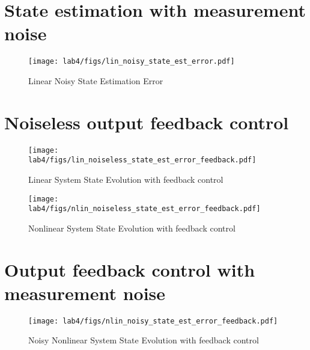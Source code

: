 \documentclass[10pt]{article}
\newcommand{\figscalingfactor}{0.85}
\begin{document}
\section{State estimation with measurement noise}

\begin{figure}
    \centering
    \texttt{[image: lab4/figs/lin\_noisy\_state\_est\_error.pdf]}
    \caption{Linear Noisy State Estimation Error}
    \label{fig:lin_noisy_state_est_error}
\end{figure}

\section{Noiseless output feedback control} 

\begin{figure}
    \centering
    \texttt{[image: lab4/figs/lin\_noiseless\_state\_est\_error\_feedback.pdf]}
    \caption{Linear System State Evolution with feedback control}
    \label{fig:lin_noiseless_state_est_error_feedback}
\end{figure}


\begin{figure}
    \centering
    \texttt{[image: lab4/figs/nlin\_noiseless\_state\_est\_error\_feedback.pdf]}
    \caption{Nonlinear System State Evolution with feedback control}
    \label{fig:nlin_noiseless_state_est_error_feedback}
\end{figure}


\section{Output feedback control with measurement noise}

\begin{figure}
    \centering
    \texttt{[image: lab4/figs/nlin\_noisy\_state\_est\_error\_feedback.pdf]}
    \caption{Noisy Nonlinear System State Evolution with feedback control}
    \label{fig:nlin_noisy_state_est_error_feedback}
\end{figure}
\end{document}
